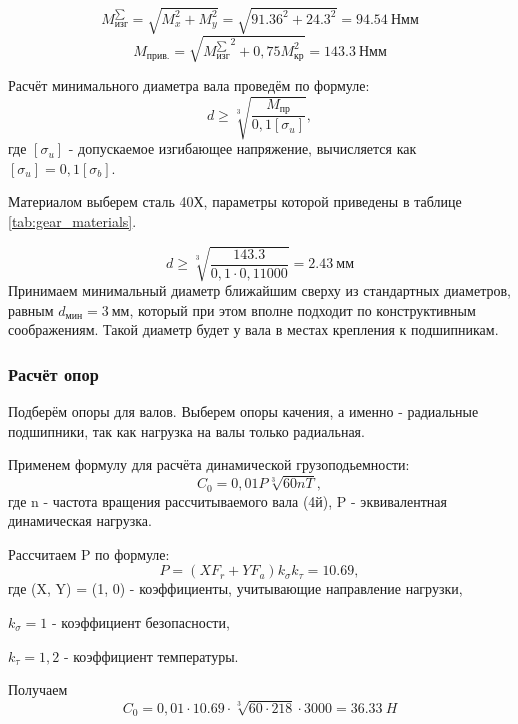 \documentclass[14pt,a4paper,russian]{scrartcl}
\begin{document}
        \[ M^{\sum}_\text{изг} = \sqrt{M_x^2 + M_y^2} = \sqrt{91.36^2 + 24.3^2} = 94.54\ \text{Нмм}\]
        \[ M_\text{прив.} = \sqrt{{M^{\sum}_\text{изг}}^2 + 0,75M_\text{кр}^2} = 143.3\ \text{Нмм}\]

        Расчёт минимального диаметра вала проведём по формуле:
        \[ d\geq \sqrt[3]{\frac{M_\text{пр}}{0,1[\sigma_u]}}, \]
        где \( [\sigma_u] \) - допускаемое изгибающее напряжение, вычисляется как
         \( [\sigma_u] = 0,1[\sigma_b] \).\par
        Материалом выберем сталь 40Х, параметры которой приведены в таблице \ref{tab:gear_materials}.\par

        \[ d\geq \sqrt[3]{\frac{143.3}{0,1\cdot 0,1 1000}} = 2.43\ \text{мм} \]
        Принимаем минимальный диаметр ближайшим сверху из стандартных диаметров, равным
        \( d_{\text{мин}} = 3\ \text{мм} \), который при этом вполне подходит по конструктивным
        соображениям. Такой диаметр будет у вала в местах крепления к подшипникам.

    \subsubsection{Расчёт опор}
        Подберём опоры для валов. Выберем опоры качения, а именно - радиальные подшипники,
        так как нагрузка на валы только радиальная.\par
        Применем формулу для расчёта динамической грузоподьемности:
        \[ C_0 = 0,01P\sqrt[3]{60nT}, \]
        где n - частота вращения рассчитываемого вала (4й), P - эквивалентная
        динамическая нагрузка.\par
        Рассчитаем P по формуле:
        \[ P = (XF_r + YF_a)k_\sigma k_\tau = 10.69, \]
        где (X, Y) = (1, 0) - коэффициенты, учитывающие направление нагрузки,\par
            \( k_\sigma = 1 \) - коэффициент безопасности,\par
            \( k_\tau=1,2 \) - коэффициент температуры.\par
        Получаем
        \[ C_0 = 0,01\cdot 10.69 \cdot \sqrt[3]{60\cdot 218}\cdot 3000 = 36.33\ H \]
\end{document}
